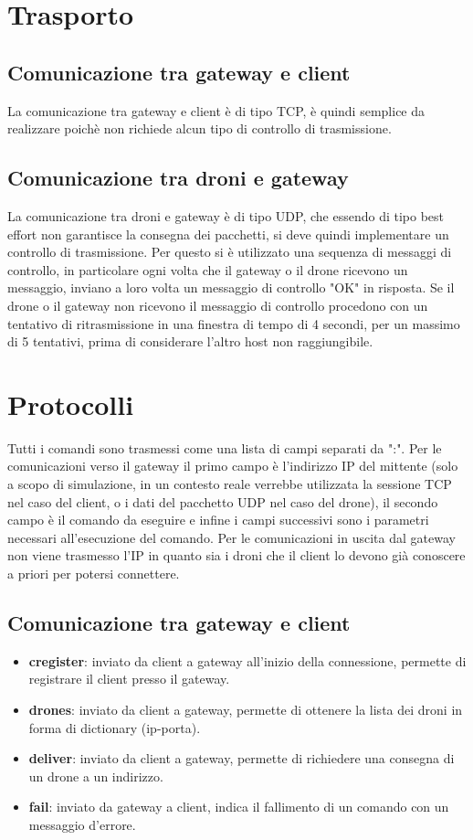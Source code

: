\documentclass[a4paper,12pt]{report}
\begin{document}
\chapter{Trasporto}
\section{Comunicazione tra gateway e client}
La comunicazione tra gateway e client è di tipo TCP, è quindi semplice da realizzare poichè non richiede alcun tipo di controllo di trasmissione.
\section{Comunicazione tra droni e gateway}
La comunicazione tra droni e gateway è di tipo UDP, che essendo di tipo best effort non garantisce la consegna dei pacchetti, si deve quindi implementare un controllo 
di trasmissione. Per questo si è utilizzato una sequenza di messaggi di controllo, in particolare ogni volta che il gateway o il drone ricevono un messaggio, inviano a 
loro volta un messaggio di controllo "OK" in risposta. Se il drone o il gateway non ricevono il messaggio di controllo procedono con un tentativo di ritrasmissione in una
finestra di tempo di 4 secondi, per un massimo di 5 tentativi, prima di considerare l'altro host non raggiungibile.


\chapter{Protocolli}
Tutti i comandi sono trasmessi come una lista di campi separati da ":". 
Per le comunicazioni verso il gateway il primo campo è l'indirizzo IP del mittente (solo a scopo di simulazione, in un contesto reale verrebbe utilizzata la sessione TCP 
nel caso del client, o i dati del pacchetto UDP nel caso del drone), il secondo campo è il comando da eseguire e infine i campi successivi sono i parametri necessari 
all'esecuzione del comando.
Per le comunicazioni in uscita dal gateway non viene trasmesso l'IP in quanto sia i droni che il client lo devono già conoscere a priori per potersi connettere.
\section{Comunicazione tra gateway e client}
\begin{itemize}
    \item \textbf{cregister}: inviato da client a gateway all'inizio della connessione, permette di registrare il client presso il gateway.
    \item \textbf{drones}: inviato da client a gateway, permette di ottenere la lista dei droni in forma di dictionary (ip-porta).
    \item \textbf{deliver}: inviato da client a gateway, permette di richiedere una consegna di un drone a un indirizzo.
    \item \textbf{fail}: inviato da gateway a client, indica il fallimento di un comando con un messaggio d'errore.
\end{itemize}
\end{document}
